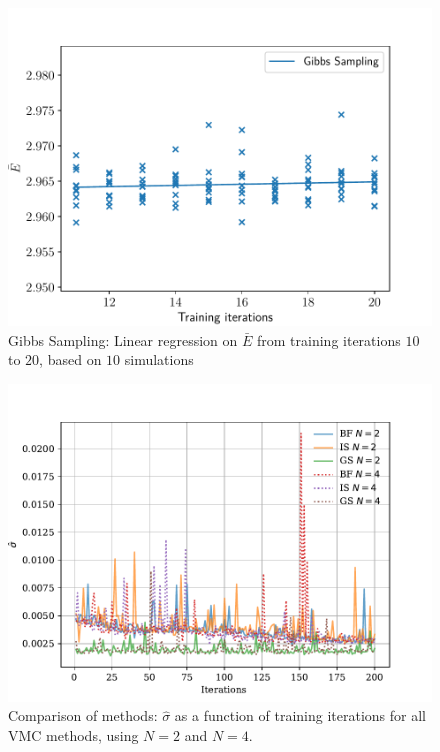\documentclass[%
oneside,                 %
final,                   %
10pt]{article}
\begin{document}
\begin{appendices}
\begin{figure}[H]
        \centering 
         \includegraphics[scale=0.7]{../Results/sim_12/regression/Regression_GS.pdf} 
        \caption{Gibbs Sampling: Linear regression on $\bar E$ from training iterations $10$ to $20$, based on $10$ simulations }
        \label{fig:reg_GS}   
\end{figure}  

\begin{figure}[H]
        \centering 
         \includegraphics[scale=0.8]{../Results/sim_15/n2_error_interacting_long.pdf} 
        \caption{Comparison of methods: $\hat \sigma$ as a function of training iterations for all VMC methods, using $N=2$ and $N=4$. }
        \label{fig:reg_sigma_long}   
\end{figure}  


\end{appendices}
\end{document}
